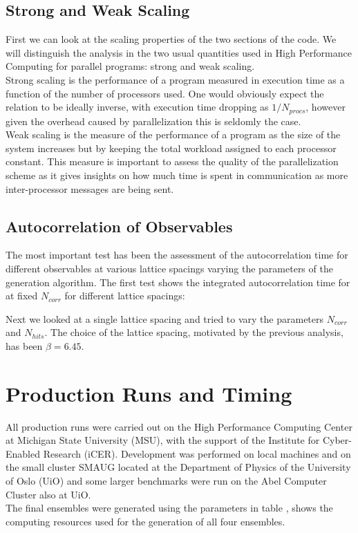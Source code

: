 \subsection{Strong and Weak Scaling}
First we can look at the scaling properties of the two sections of the code. We will distinguish the analysis in the two usual quantities used in High Performance Computing for parallel programs: strong and weak scaling. \\
Strong scaling is the performance of a program measured in execution time as a function of the number of processors used. One would obviously expect the relation to be ideally inverse, with execution time dropping as $1/N_{procs}$, however given the overhead caused by parallelization this is seldomly the case. \\
Weak scaling is the measure of the performance of a program as the size of the system increases but by keeping the total workload assigned to each processor constant. This measure is important to assess the quality of the parallelization scheme as it gives insights on how much time is spent in communication as more inter-processor messages are being sent.

\subsection{Autocorrelation of Observables}
The most important test has been the assessment of the autocorrelation time for different observables at various lattice spacings varying the parameters of the generation algorithm. The first test shows the integrated autocorrelation time for  at fixed $N_{corr}$ for different lattice spacings:


Next we looked at a single lattice spacing and tried to vary the parameters $N_{corr}$ and $N_{hits}$. The choice of the lattice spacing, motivated by the previous analysis, has been $\beta=6.45$.  


\section{Production Runs and Timing}
All production runs were carried out on the High Performance Computing Center at Michigan State University (MSU), with the support of the Institute for Cyber-Enabled Research (iCER). Development was performed on local machines and on the small cluster SMAUG located at the Department of Physics of the University of Oslo (UiO) and some larger benchmarks were run on the Abel Computer Cluster also at UiO.\\
The final ensembles were generated using the parameters in table \LINK, shows the computing resources used for the generation of all four ensembles. 